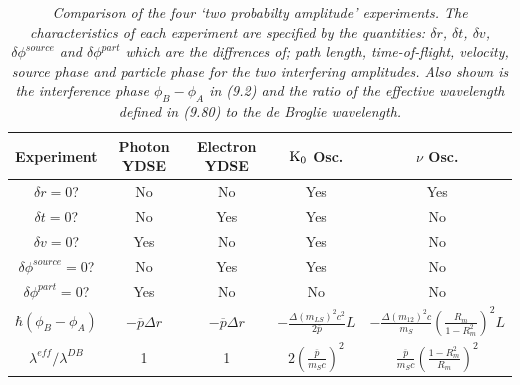 \documentclass [12pt]{article}
\begin{document}
{     \begin{table}
   \begin{center}
   \begin{tabular}{|c||c| c| c| c|} \hline  
   Experiment   & Photon YDSE  & Electron  YDSE  &  ${\rm K}_0$ Osc. &  $\nu $ Osc. \\
  \hline        
  \hline
   $\delta r = 0$? & No & No & Yes & Yes \\
  $\delta t = 0$? & No & Yes & Yes & No \\
 $\delta v = 0$? & Yes & No & Yes & No \\
 $\delta \phi^{source} = 0$? & No & Yes & Yes & No \\
$\delta \phi^{part} = 0$? & Yes & No & No & No \\
$\hbar(\phi_B-\phi_A)$ & $-\overline{p} \Delta r$ & $-\overline{p} \Delta r$ &
  $-\frac{\Delta(m_{LS})^2 c^2}{2 \overline{p}}L$ & $-\frac{\Delta(m_{12})^2c}{m_S}\left(\frac{R_m}{1-R_m^2}\right)^2L$  \\
$\lambda^{eff}/\lambda^{DB}$ & 1 & 1 &  $2\left(\frac{\overline{p}}{m_S c}\right)^2$ &
  $\frac{\overline{p}}{m_S c}\left(\frac{1-R_m^2}{R_m}\right)^2$    \\
 \hline
  \end{tabular}
   \caption[] {{\sl Comparison of the four `two probabilty amplitude' experiments.
 The characteristics of each experiment are specified by the quantities: $\delta r$,  $\delta t$,
   $\delta v$, $\delta \phi^{source}$ and $\delta \phi^{part}$ which are the diffrences of;
   path length, time-of-flight, velocity, source phase and particle phase for the two interfering
 amplitudes. Also shown is the interference phase $\phi_B-\phi_A$ in (9.2) and the ratio of
  the effective wavelength defined in (9.80) to the de Broglie wavelength. }} 
  \end{center}
  \end{table}    

}
\end{document}
